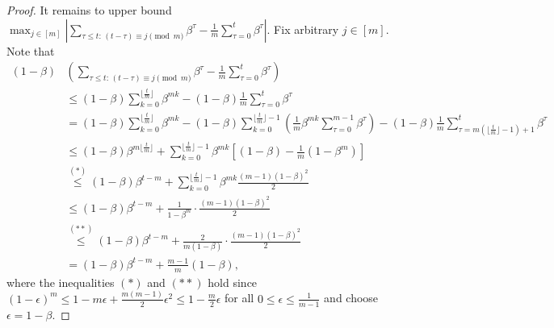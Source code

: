 \documentclass{article} %
\theoremstyle{plain}
\theoremstyle{definition}
\theoremstyle{remark}
\begin{document}
\begin{proof}
    It remains to upper bound $\max_{j\in [m]}\left| \sum_{\tau\leq t:\, (t-\tau)\equiv j \pmod m}\beta^\tau - \frac 1m \sum_{\tau=0}^t \beta^\tau \right|$. Fix arbitrary $j\in [m]$. Note that
    \begin{align*}
        (1-\beta) & \left(\sum_{\tau\leq t:\, (t-\tau)\equiv j \pmod m}\beta^\tau - \frac 1m \sum_{\tau=0}^t \beta^\tau \right) \\
        &\leq  (1-\beta)\sum_{k=0}^{\lfloor \tfrac tm\rfloor} \beta^{mk} - (1-\beta) \frac 1m \sum_{\tau=0}^t \beta^\tau \\
        &= (1-\beta)\sum_{k=0}^{\lfloor \tfrac tm\rfloor} \beta^{mk} - (1-\beta) \sum_{k=0}^{\lfloor \tfrac tm\rfloor - 1}  \left(\frac 1m \beta^{mk}\sum_{\tau=0}^{m-1}\beta^\tau\right) - (1-\beta)\frac 1m \sum_{\tau=m(\lfloor \tfrac tm\rfloor-1)+1}^t \beta^\tau\\
        &\leq (1-\beta) \beta^{m\lfloor \tfrac tm\rfloor} + \sum_{k=0}^{\lfloor \tfrac tm\rfloor-1} \beta^{mk} \left[(1-\beta) - \frac{1}{m} (1-\beta^m) \right] \\
        &\overset{(*)}{\leq} (1-\beta) \beta^{t-m} + \sum_{k=0}^{\lfloor \tfrac tm\rfloor-1} \beta^{mk} \frac{(m-1)(1-\beta)^2}{2}  \\
        &\leq (1-\beta) \beta^{t-m} + \frac{1}{1-\beta^m} \cdot \frac{(m-1)(1-\beta)^2}{2} \\
        &\overset{(**)}{\leq} (1-\beta) \beta^{t-m} +  \frac{2}{m(1-\beta)} \cdot \frac{(m-1)(1-\beta)^2}{2} \\
        &= (1-\beta) \beta^{t-m} + \frac{m-1}{m} (1-\beta),
    \end{align*}
    where the inequalities $(*)$ and $(**)$ hold since $(1-\epsilon)^m \leq 1-m\epsilon+\tfrac{m(m-1)}{2}\epsilon^2 \leq 1- \tfrac m2\epsilon$ for all $0\leq \epsilon\leq \tfrac{1}{m-1}$ and choose $\epsilon = 1-\beta$.
    

\end{proof}
\end{document}
